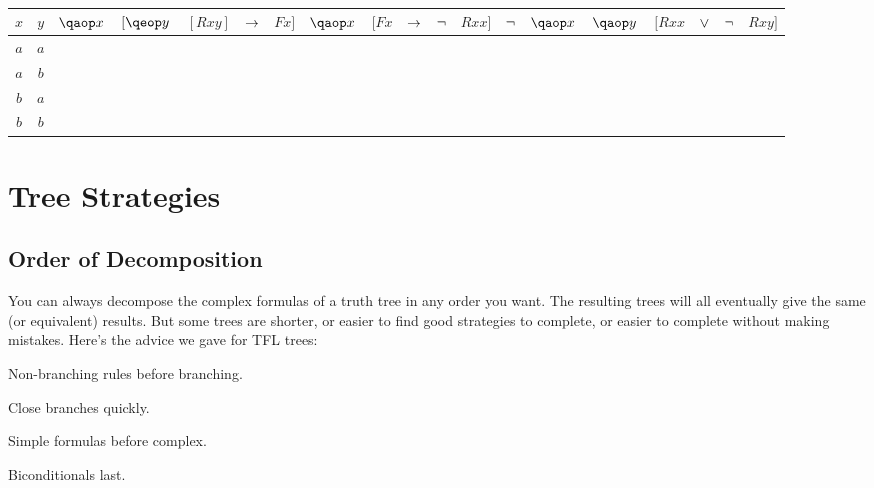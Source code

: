 \documentclass[PHIL101-Textbook.tex]{subfiles}
\begin{document}
$ $\\


\begin{tabular}{c c | ceeec | ceeec | ceeeeec }
$x$ &$y$&	$\qa x $ & $[\qe y$ & $ [Rxy] $ & $\rightarrow$ & $Fx]$ 
		&	$\qa x $ & $[Fx$ & $\rightarrow$ & $\neg$ & $Rxx]$
		& 	$\neg$ & $ \qa x $ & $\qa y $ & $[Rxx $ & $\vee $ & $\neg$ & $ Rxy]$
    \\
\hline
$a$ & $a$&	 &  & \vF &  & 
		&	 &  &  &  & 
		& 	 &  &  & \vF & \vT & \vT & \vF\\

$a$ & $b$&	$ $ & $ $ & \vT & $ $ & $ $ 
		&	$ $ & $ $ & $ $ & $ $ & $ $
		& 	$ $ & $ $ & $ $ & \vF & \vF & \vF & \vT\\


$b$ & $a$&	$ $ &  & \vF &  & 
		&	$ $ &  &  &  & 
		& 	$ $ & $ $ &  & \vF & \vT & \vT & \vF\\

$b$ & $b$&	$ $ & $ $ & \vF & $ $ & $ $ 
		&	$ $ & $ $ & $ $ & $ $ & $ $
		& 	$ $ & $ $ & $ $ & \vF & \vT & \vT & \vF\\
\end{tabular} 




\pagebreak



\chapter{Tree Strategies}\label{ch:pl.tree.strategies}
\section{Order of Decomposition}

You can always decompose the complex formulas of a truth tree in any order you want. The resulting trees will all eventually give the same (or equivalent) results. But some trees are shorter, or easier to find good strategies to complete, or easier to complete without making mistakes. Here's the advice we gave for TFL trees:

\begin{earg}
\item Non-branching rules before branching. 
\item Close branches quickly.
\item Simple formulas before complex. 
\item Biconditionals last.
\end{earg}
\end{document}
